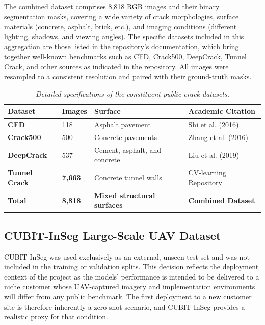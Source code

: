 \newpage

\hs The combined dataset comprises 8,818 RGB images and their binary segmentation masks, covering a wide variety of crack morphologies, surface materials (concrete, asphalt, brick, etc.), and imaging conditions (different lighting, shadows, and viewing angles). The specific datasets included in this aggregation are those listed in the repository’s documentation, which bring together well-known benchmarks such as CFD, Crack500, DeepCrack, Tunnel Crack, and other sources as indicated in the repository. All images were resampled to a consistent resolution and paired with their ground-truth masks.

\begin{table}[htbp]
    \centering
    \setlength{\tabcolsep}{5pt}
    \caption{\textit{Detailed specifications of the constituent public crack datasets.}}
    \label{tab:constituent_datasets}
    \begin{tabularx}{\textwidth}{l l X X}
        \toprule
        \textbf{Dataset}      & \textbf{Images} & \textbf{Surface}                   & \textbf{Academic Citation}             \\
        \midrule
        \textbf{CFD}          & 118             & Asphalt pavement                   & Shi et al. (2016) \cite{28-shi-2016}      \\
        \addlinespace
        \textbf{Crack500}     & 500             & Concrete pavements                 & Zhang et al. (2016) \cite{08-zhang-2016}  \\
        \addlinespace
        \textbf{DeepCrack}    & 537             & Cement, asphalt, and concrete      & Liu et al. (2019) \cite{03-liu-2019}   \\
        \addlinespace
        \textbf{Tunnel Crack} & \textbf{7,663}  & Concrete tunnel walls              & CV-learning Repository\footnotemark[1] \\
        \midrule
        \textbf{Total}        & \textbf{8,818}  & \textbf{Mixed structural surfaces} & \textbf{Combined Dataset}              \\
        \bottomrule
    \end{tabularx}
\end{table}

\subsection{CUBIT-InSeg Large-Scale UAV Dataset}
\label{sebsec:cubit-for-zero-shot}
\hs CUBIT-InSeg was used exclusively as an external, unseen test set and was not included in the training or validation splits. This decision reflects the deployment context of the project as the models' performance is intended to be delivered to a niche customer whose UAV-captured imagery and implementation environments will differ from any public benchmark. The first deployment to a new customer site is therefore inherently a zero-shot scenario, and CUBIT-InSeg provides a realistic proxy for that condition.

